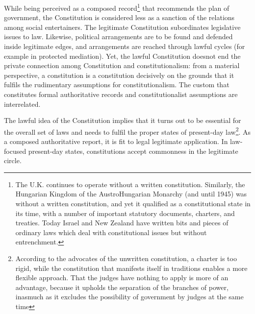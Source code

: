 \setcounter{figure}{0}
\setcounter{table}{0}
\setcounter{footnote}{0}



\begin{multicols}{2}


\noi
While being perceived as a composed record\footnote{The U.K. continues to operate without a written constitution. Similarly, the Hungarian Kingdom of the AustroHungarian Monarchy (and until 1945) was without a written constitution, and yet it qualified as a constitutional
state in its time, with a number of important statutory documents, charters, and treaties. Today Israel and New
Zealand have written bits and pieces of ordinary laws which deal with constitutional issues but without
entrenchment.}  that recommends the plan of government, the
Constitution is considered less as a sanction of the relations among social entertainers. The
legitimate Constitution subordinates legislative issues to law. Likewise, political
arrangements are to be found and defended inside legitimate edges, and arrangements are
reached through lawful cycles (for example in protected mediation). Yet, the lawful
Constitution doesnot end the private connection among Constitution and constitutionalism:
from a material perspective, a constitution is a constitution decisively on the grounds that it
fulfils the rudimentary assumptions for constitutionalism. The custom that constitutes formal
authoritative records and constitutionalist assumptions are interrelated.

\noi
The lawful idea of the Constitution implies that it turns out to be essential for the overall set
of laws and needs to fulfil the proper states of present-day law\footnote{According to the advocates of the unwritten constitution, a charter is too rigid, while the constitution that
manifests itself in traditions enables a more flexible approach. That the judges have nothing to apply is more of
an advantage, because it upholds the separation of the branches of power, inasmuch as it excludes the possibility
of government by judges at the same time}. As a composed authoritative
report, it is fit to legal legitimate application. In law-focused present-day states, constitutions
accept commonness in the legitimate circle.


\end{multicols}
